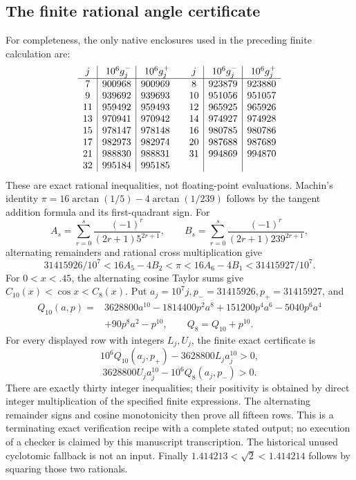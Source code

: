\subsection{The finite rational angle certificate}
\label{app:A18anglecertificate}
For completeness, the only native enclosures
used in the preceding finite calculation are:
\[
\begin{array}{c|r|r@{\qquad}c|r|r}
j&10^6g_j^-&10^6g_j^+&
j&10^6g_j^-&10^6g_j^+\\ \hline
7&900968&900969&8&923879&923880\\
9&939692&939693&10&951056&951057\\
11&959492&959493&12&965925&965926\\
13&970941&970942&14&974927&974928\\
15&978147&978148&16&980785&980786\\
17&982973&982974&20&987688&987689\\
21&988830&988831&31&994869&994870\\
32&995184&995185&&&
\end{array}
\]
These are exact rational inequalities, not
floating-point evaluations.
Machin's identity
\(\pi=16\arctan(1/5)-4\arctan(1/239)\)
follows by the tangent addition formula
and its first-quadrant sign.
For
\[
 A_s=\sum_{r=0}^s\frac{(-1)^r}{(2r+1)5^{2r+1}},
 \qquad
 B_s=\sum_{r=0}^s\frac{(-1)^r}{(2r+1)239^{2r+1}},
\]
alternating remainders and rational
cross multiplication give
\[
 31415926/10^7<16A_5-4B_2<\pi
 <16A_6-4B_1<31415927/10^7.
\]
For \(0<x<.45\), the alternating cosine
Taylor sums give \(C_{10}(x)<\cos x<C_8(x)\).
Put \(a_j=10^7j,p_-=31415926,p_+=31415927\), and
\[
\begin{split}
Q_{10}(a,p)={}&3628800a^{10}-1814400p^2a^8
 +151200p^4a^6-5040p^6a^4\\
 &+90p^8a^2-p^{10},\qquad Q_8=Q_{10}+p^{10}.
\end{split}
\]
For every displayed row with integers \(L_j,U_j\),
the finite exact certificate is
\[
 10^6Q_{10}(a_j,p_+)-3628800L_ja_j^{10}>0,
\]
\[
 3628800U_ja_j^{10}-10^6Q_8(a_j,p_-)>0.
\]
There are exactly thirty integer inequalities;
their positivity is obtained by direct
integer multiplication of the specified
finite expressions.
The alternating remainder signs and cosine
monotonicity then prove all fifteen rows.
This is a terminating exact verification
recipe with a complete stated output;
no execution of a checker is claimed by
this manuscript transcription.
The historical unused cyclotomic fallback
is not an input.
Finally \(1.414213<\sqrt2<1.414214\)
follows by squaring those two rationals.

